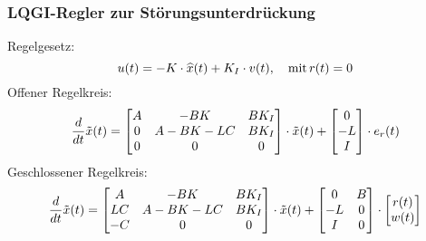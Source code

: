     \subsubsection{LQGI-Regler zur Störungsunterdrückung}
        Regelgesetz:
        \begin{equation*}
            u(t) = -K\cdot\widehat{x}(t) + K_I\cdot v(t),\quad\textnormal{mit}\, r(t) = 0
        \end{equation*}
        Offener Regelkreis:
        \begin{equation*}
            \frac{d}{dt}\Tilde{x}(t) = 
            \begin{bmatrix}
            A   & -BK &   BK_I\\
            0   &   A-BK-LC &   BK_I\\
            0   &   0   &   0
            \end{bmatrix}\cdot\Tilde{x}(t) +
            \begin{bmatrix} 0\\ -L\\ I\end{bmatrix}\cdot e_r(t)
        \end{equation*}
        Geschlossener Regelkreis:
        \begin{equation*}
            \frac{d}{dt}\Tilde{x}(t) = 
            \begin{bmatrix}
            A   & -BK &   BK_I\\
            LC   &   A-BK-LC &   BK_I\\
            -C  &   0   &   0
            \end{bmatrix}\cdot\Tilde{x}(t) +
            \begin{bmatrix} 0 & B\\ -L & 0\\ I & 0\end{bmatrix}\cdot \begin{bmatrix}r(t)\\w(t)\end{bmatrix}
        \end{equation*}
        
